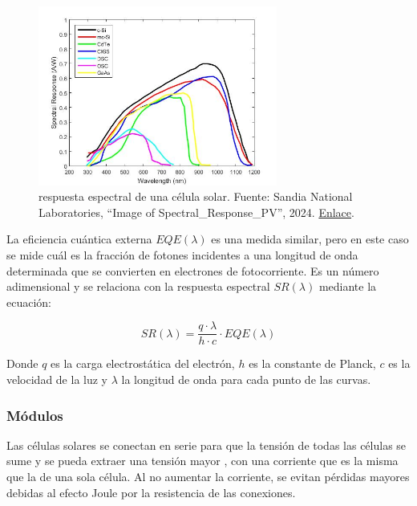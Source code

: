 \begin{figure}[H]
      \centering
      \includegraphics[width=0.7\textwidth]{./images/SoA_irrad/Spectral_Response_PV.jpg}
      \caption{\Gls{respuesta espectral} de una \gls{célula solar}. Fuente: Sandia National Laboratories, ``Image of Spectral\_Response\_PV'', 2024. \href{https://pvpmc.sandia.gov/modeling-guide/2-dc-module-iv/effective-irradiance/spectral-response/}{Enlace}.}
      \label{fig:spectral_response}
\end{figure}

La \gls{eficiencia cuántica externa} $EQE(\lambda)$ es una medida similar, pero en este caso se mide cuál es la fracción de fotones incidentes a una \gls{longitud de onda} determinada que se convierten en electrones de fotocorriente. Es un número adimensional y se relaciona con la \gls{respuesta espectral} $SR(\lambda)$ mediante la ecuación:

\begin{equation} \label{eq:relacion_sr_eqe}
      SR(\lambda) = \frac{q \cdot \lambda}{h \cdot c} \cdot EQE(\lambda)
\end{equation}

Donde $q$ es la carga electrostática del electrón, $h$ es la constante de Planck, $c$ es la velocidad de la luz y $\lambda$ la \gls{longitud de onda} para cada punto de las curvas.

\subsubsection{Módulos}

Las células solares se conectan en serie para que la tensión de todas las células se sume y se pueda extraer una tensión mayor \cite{victoria2024fundamentals}, con una corriente que es la misma que la de una sola célula. Al no aumentar la corriente, se evitan pérdidas mayores debidas al \gls{efecto Joule} por la resistencia de las conexiones.

